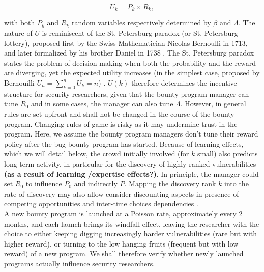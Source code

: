 \begin{equation}
\label{ }
U_k = P_k \times R_k,
\end{equation}

\noindent with both $P_k$ and $R_k$ random variables respectively determined by $\beta$ and $\Lambda$. The nature of $U$ is reminiscent of the St. Petersburg paradox (or St. Petersburg lottery), proposed first by the Swiss Mathematician Nicolas Bernoulli in 1713, and later formalized by his brother Daniel in 1738 \cite{bernoulli1954exposition}. The St. Petersburg paradox states the problem of decision-making when both the probability and the reward are diverging, yet the expected utility increases (in the simplest case, proposed by Bernouilli $U_n = \sum_{k=0}^{n} U_k = n$) \cite{bernoulli1954exposition}. $U(k)$ therefore determines the incentive structure for security researchers, given that the bounty program manager can tune $R_0$ and in some cases, the manager can also tune $\Lambda$. However, in general rules are set upfront and shall not be changed in the course of the bounty program. Changing rules of game is risky as it may undermine trust in the program. Here, we assume the bounty program managers don't tune their reward policy after the bug bounty program has started. Because of learning effects, which we will detail below, the crowd initially involved (for $k$ small) also predicts long-term activity, in particular for the discovery of highly ranked vulnerabilities {\bf (as a result of learning /expertise effects?)}. In principle, the manager could set $R_0$ to influence $P_0$ and indirectly $P$. Mapping the discovery rank $k$ into the rate of discovery may also allow consider discounting aspects in presence of competing opportunities \cite{} and inter-time choices dependencies \cite{}.\\

A new bounty program is launched at a Poisson rate, approximately every 2 months, and each launch brings its windfall effect, leaving the researcher with the choice to either keeping digging increasingly harder vulnerabilities (rare but with higher reward), or turning to the low hanging fruits (frequent but with low reward) of a new program. We shall therefore verify whether newly launched programs actually influence security researchers.
















